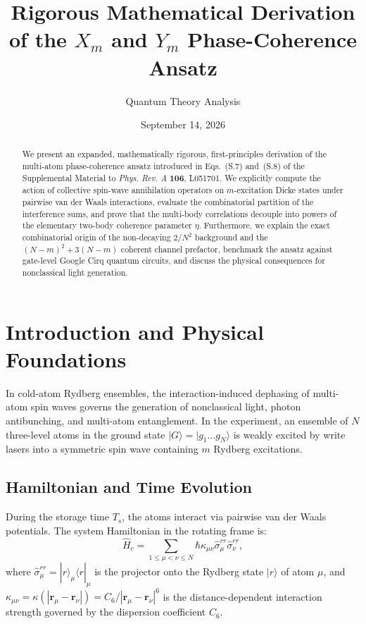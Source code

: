 \documentclass[11pt,a4paper]{article}
\title{\textbf{Rigorous Mathematical Derivation of the $X_m$ and $Y_m$ Phase-Coherence Ansatz}}
\author{Quantum Theory Analysis}
\date{September 14, 2026}
\begin{document}
\maketitle

\begin{abstract}
We present an expanded, mathematically rigorous, first-principles derivation of the multi-atom phase-coherence ansatz introduced in Eqs.~(S.7) and~(S.8) of the Supplemental Material to \textit{Phys. Rev. A} \textbf{106}, L051701. We explicitly compute the action of collective spin-wave annihilation operators on $m$-excitation Dicke states under pairwise van der Waals interactions, evaluate the combinatorial partition of the interference sums, and prove that the multi-body correlations decouple into powers of the elementary two-body coherence parameter $\eta$. Furthermore, we explain the exact combinatorial origin of the non-decaying $2/N^2$ background and the $(N-m)^2 + 3(N-m)$ coherent channel prefactor, benchmark the ansatz against gate-level Google Cirq quantum circuits, and discuss the physical consequences for nonclassical light generation.
\end{abstract}

\section{Introduction and Physical Foundations}

In cold-atom Rydberg ensembles, the interaction-induced dephasing of multi-atom spin waves governs the generation of nonclassical light, photon antibunching, and multi-atom entanglement. In the experiment, an ensemble of $N$ three-level atoms in the ground state $|G\rangle = |g_1 \dots g_N\rangle$ is weakly excited by write lasers into a symmetric spin wave containing $m$ Rydberg excitations.

\subsection{Hamiltonian and Time Evolution}
During the storage time $T_s$, the atoms interact via pairwise van der Waals potentials. The system Hamiltonian in the rotating frame is:
\begin{equation}
    \hat{H}_c = \sum_{1 \le \mu < \nu \le N} \hbar \kappa_{\mu\nu} \hat{\sigma}_\mu^{rr} \hat{\sigma}_\nu^{rr},
    \label{eq:H_rydberg}
\end{equation}
where $\hat{\sigma}_\mu^{rr} = |r\rangle_\mu \langle r|_\mu$ is the projector onto the Rydberg state $|r\rangle$ of atom $\mu$, and $\kappa_{\mu\nu} = \kappa(|\mathbf{r}_\mu - \mathbf{r}_\nu|) = C_6 / |\mathbf{r}_\mu - \mathbf{r}_\nu|^6$ is the distance-dependent interaction strength governed by the dispersion coefficient $C_6$.
\end{document}
